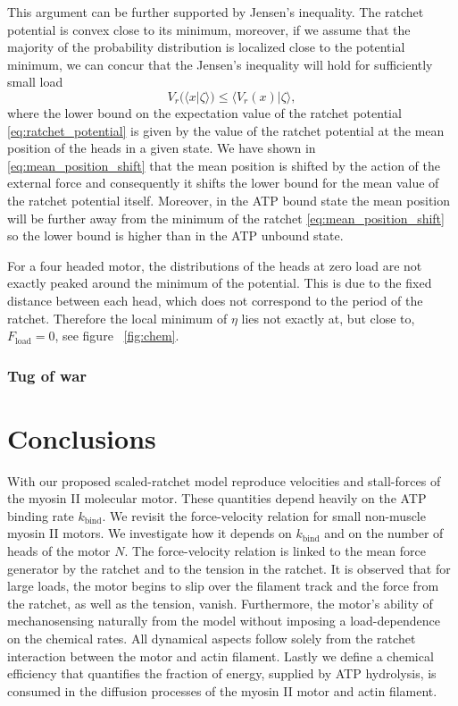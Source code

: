 \documentclass[aps,pre,twocolumn,showpacs,showkeys,superscriptaddress,floatfix]{revtex4-1}
\begin{document}
This argument can be further supported by Jensen's inequality.
The ratchet potential is convex close to its minimum, 
moreover, if we assume that the majority of the probability distribution is localized close to the potential minimum,
we can concur that the Jensen's inequality will hold for sufficiently small load  
\begin{equation*}
V_r(\langle x | \zeta \rangle) \leq \langle V_r(x) | \zeta \rangle , 
\end{equation*} 
where the lower bound on the expectation value of the ratchet potential \eqref{eq:ratchet_potential} is given by the value of the ratchet potential at the mean position of the heads in a given state. 
We have shown in \eqref{eq:mean_position_shift} that the mean position is shifted by the action of the external force and consequently it shifts the lower bound for the mean value of the ratchet potential itself. 
Moreover, in the ATP bound state the mean position will be further away from the minimum of the ratchet \eqref{eq:mean_position_shift} so the lower bound is higher than in the ATP unbound state.

For a four headed motor, the distributions of the heads at zero load are not exactly peaked around the minimum of the potential. 
This is due to the fixed distance between each head, which does not correspond to the period of the ratchet. 
Therefore the local minimum of $\eta$ lies not exactly at, but close to, $F_\text{load} =0$, see figure ~\ref{fig:chem}.

\subsubsection{Tug of war}


\section{Conclusions}

With our proposed scaled-ratchet model reproduce velocities and stall-forces of the myosin II molecular motor. These quantities depend heavily on the ATP binding rate $k_\text{bind}$.
We revisit the force-velocity relation for small non-muscle myosin II motors. We investigate how it depends on $k_\text{bind}$ and on the number of heads of the motor $N$.
The force-velocity relation is linked to the mean force generator by the ratchet and to the tension in the ratchet. 
It is observed that for large loads, the motor begins to slip over the filament track and the force from the ratchet, as well as the tension, vanish.
Furthermore, the motor's ability of mechanosensing naturally from the model without imposing a load-dependence on the chemical rates.
All dynamical aspects follow solely from the ratchet interaction between the motor and actin filament.
Lastly we define a chemical efficiency that quantifies the fraction of energy, supplied by ATP hydrolysis, is consumed in the diffusion processes of the myosin II motor and actin filament.  
\end{document}
